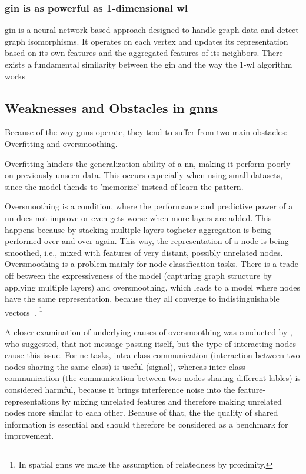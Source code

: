 \subsubsection{\acl*{gin} is as powerful as 1-dimensional \acs*{wl}}
\Ac{gin} is a neural network-based approach designed to handle graph data and detect graph isomorphisms. It operates on each vertex and updates its representation based on its own features and the aggregated features of its neighbors. There exists a fundamental similarity between the \ac{gin} and the way the 1-\ac{wl} algorithm works
\subsection{Weaknesses and Obstacles in \acsp*{gnn}}
\label{sec:related:pred:typical}
Because of the way \acp{gnn} operate, they tend to suffer from two main obstacles:
Overfitting and oversmoothing.

Overfitting hinders the generalization ability of a \acf{nn}, making it perform poorly
on previously unseen data. This occurs expecially when using small datasets, since the model thends to 'memorize' instead of learn the pattern.

Oversmoothing is a condition, where the performance and predictive power of a \ac{nn}
does not improve or even gets worse when more layers are added. This happens because
by stacking multiple layers  togheter aggregation is being performed over and over again.
This way, the representation of a node is being smoothed, i.e., mixed with features of
very distant, possibly unrelated nodes. Oversmoothing is a problem mainly for node classification tasks. There is a trade-off between the expressiveness of the model (capturing graph structure by applying multiple layers) and oversmoothing, which leads
to a model where nodes have the same representation, because they all converge to indistinguishable vectors~\cite{Zhou2020,Hasanzadeh2020}.%
\footnote{In spatial \acp{gnn} we make the assumption of relatedness by proximity.}

A closer examination of underlying causes of oversmoothing was conducted by \citet{Chen2020}, who suggested, that not message passing itself, but the type of interacting nodes cause this issue.
For \acf{nc} tasks, intra-class communication (interaction between two nodes sharing the same class) is useful (signal), whereas inter-class communication (the communication between two nodes sharing different lables) is considered harmful, because it brings interference noise into the feature-representations by mixing unrelated features and therefore making unrelated nodes more similar to each other. Because of that, the the quality of shared information is essential and should therefore be considered as a benchmark for improvement.


